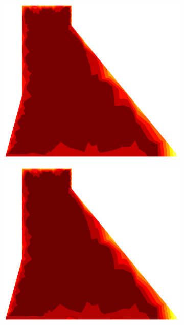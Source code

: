 \documentclass[10pt, a4paper]{article}
\begin{document}
\begin{figure}[H]
\begin{subfigure}[H]{0.19\textwidth}
	\end{subfigure}
	\begin{subfigure}[H]{0.19\textwidth}
		\includegraphics[width=1.2\textwidth]{fig/2.eps}
	\end{subfigure}
	\begin{subfigure}[H]{0.19\textwidth}
		\includegraphics[width=1.2\textwidth]{fig/3.eps}
	\end{subfigure}
	\begin{subfigure}[H]{0.19\textwidth}

\end{subfigure}
\end{figure}
\end{document}
